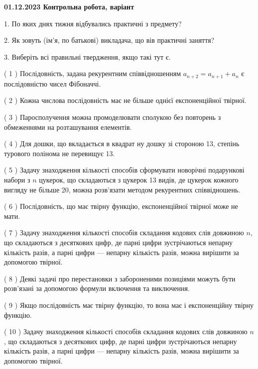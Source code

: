 \documentclass[12pt, ukrainian]{article}
\begin{document}
\vspace{4mm}
\newpage
\begin {large}

\textbf{01.12.2023 Контрольна робота, варіант  }\par


{
1. По яких днях тижня відбувались практичні з предмету?



\vspace{5mm}
2. Як зовуть (ім'я, по батькові) викладача, що вів практичні заняття?



\vspace{5mm}
3. Виберіть всі правильні твердження, якщо такі тут є.\par
\vspace{2mm}
( 1 ) Послідовність, задана рекурентним співвідношенням $a_{n+2}=a_{n+1}+a_{n}$ є послідовністю чисел Фібоначчі.%

( 2 ) Кожна числова послідовність має не більше однієї  експоненційної твірної.%

( 3 ) Паросполучення можна промоделювати сполукою без повторень з обмеженнями на розташування елементів.%

( 4 ) Для дошки, що вкладається в квадрат ну дошку зі стороною 13, степінь турового полінома не перевищує 13.%

( 5 ) Задачу знаходження кількості способів сформувати новорічні подарункові набори з $n$ цукерок, що складаються з цукерок 13 видів, де цукерок кожного вигляду не більше 20, можна розв’язати методом рекурентних співвідношень.%

( 6 ) Послідовність, що має твірну функцію, експоненційної твірної може не мати.%

( 7 ) Задачу знаходження кількості способів складання кодових слів довжиною $n$, що складаються з десяткових цифр, де парні цифри зустрічаються непарну кількість разів, а парні цифри — непарну кількість разів, можна вирішити за допомогою твірної.%

( 8 ) Деякі задачі про перестановки з забороненими позиціями можуть бути розв’я\-за\-ні за допомогою формули включення та виключення.%

( 9 ) Якщо послідовність має твірну функцію, то вона має і експоненційну твірну функцію.%

( 10 ) Задачу знаходження кількості способів складання кодових слів довжиною $n$, що складаються з десяткових цифр, де парні цифри зустрічаються непарну кількість разів, а парні цифри — непарну кількість разів, можна вирішити за допомогою твірної.%
}
\end {large}
\end{document}
